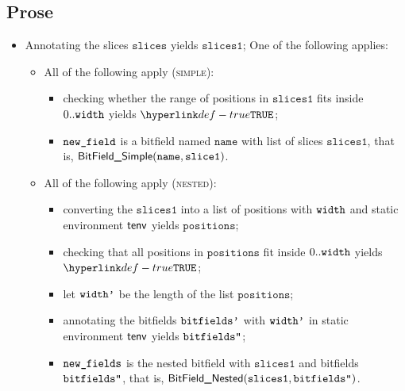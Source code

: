 \documentclass{book}
\newcommand\ProseOrTypeError[0]{\ProseTerminateAs{\TypeErrorConfig}}
\newcommand\slices[0]{\texttt{slices}}
\newcommand\sliceone[0]{\texttt{slice1}}
\newcommand\slicesone[0]{\texttt{slices1}}
\newcommand\positions[0]{\texttt{positions}}
\newcommand\name[0]{\texttt{name}}
\begin{document}
\subsection{Prose}
\begin{itemize}
  \item Annotating the slices $\slices$ yields $\slicesone$\ProseOrTypeError;
  One of the following applies:
  \begin{itemize}
    \item All of the following apply (\textsc{simple}):
    \begin{itemize}
      \item checking whether the range of positions in $\slicesone$ fits inside $0..\texttt{width}$ yields $\True$\ProseOrTypeError;
      \item $\texttt{new\_field}$ is a bitfield named $\name$ with list of slices $\slicesone$, that is, $\BitFieldSimple(\name, \sliceone)$.
    \end{itemize}

    \item All of the following apply (\textsc{nested}):
    \begin{itemize}
      \item converting the $\slicesone$ into a list of positions with $\texttt{width}$ and static environment $\textsf{tenv}$
      yields $\positions$\ProseOrTypeError;
      \item checking that all positions in $\positions$ fit inside $0..\texttt{width}$ yields \\
            $\True$\ProseOrTypeError;
      \item let $\texttt{width'}$ be the length of the list $\positions$;
      \item annotating the bitfields $\texttt{bitfields'}$ with $\texttt{width'}$ in static environment $\textsf{tenv}$ yields $\texttt{bitfields''}$\ProseOrTypeError;
      \item $\texttt{new\_fields}$ is the nested bitfield with $\slicesone$ and bitfields $\texttt{bitfields''}$, that is, $\BitFieldNested(\slicesone, \bitfieldspp)$.
    \end{itemize}


\end{itemize}
\end{itemize}
\end{document}
